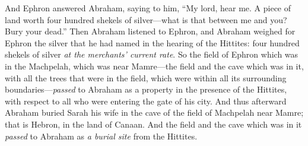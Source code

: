 \begin{biblechapter}
\verse And Ephron answered Abraham, saying to him,
\verse “My lord, hear me. A piece of land worth four hundred shekels of silver—what is that between me and you? Bury your dead.”
\verse Then Abraham listened to Ephron, and Abraham weighed for Ephron the silver that he had named in the hearing of the Hittites: four hundred shekels of silver \textit{at the merchants’ current rate}.
\verse So the field of Ephron which was in the Machpelah, which was near Mamre—the field and the cave which was in it, with all the trees that were in the field, which were within all its surrounding boundaries—\textit{passed}
\verse to Abraham as a property in the presence of the Hittites, with respect to all who were entering the gate of his city.
\verse And thus afterward Abraham buried Sarah his wife in the cave of the field of Machpelah near Mamre; that is Hebron, in the land of Canaan.
\verse And the field and the cave which was in it \textit{passed} to Abraham as \textit{a burial site} from the Hittites.
\end{biblechapter}

